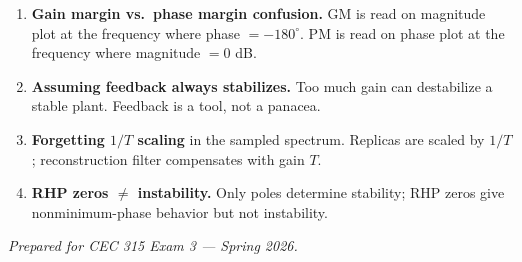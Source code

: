 \documentclass{article}
\begin{document}
\begin{enumerate}
  \item \textbf{Gain margin vs.\ phase margin confusion.} GM is read on magnitude plot at the frequency where phase $=-180^\circ$. PM is read on phase plot at the frequency where magnitude $=0$ dB.
  \item \textbf{Assuming feedback always stabilizes.} Too much gain can destabilize a stable plant. Feedback is a tool, not a panacea.
  \item \textbf{Forgetting $1/T$ scaling} in the sampled spectrum. Replicas are scaled by $1/T$; reconstruction filter compensates with gain $T$.
  \item \textbf{RHP zeros $\neq$ instability.} Only poles determine stability; RHP zeros give nonminimum-phase behavior but not instability.
\end{enumerate}

\vspace{1em}
\begin{center}
\emph{Prepared for CEC 315 Exam 3 --- Spring 2026.}
\end{center}
\end{document}
